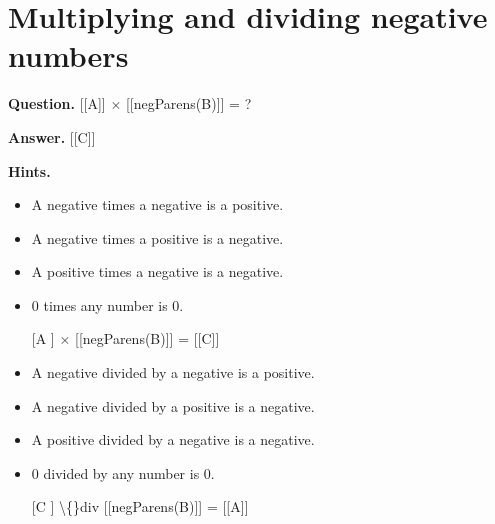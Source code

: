 \documentclass{article}
\begin{document}
\section*{Multiplying and dividing negative numbers}
\textbf{Question.} [[A]] $\times$ [[negParens(B)]] = ?

\textbf{Answer.} [[C]]

\textbf{Hints.}
\begin{itemize}
  \item A negative times a negative is a positive.
  \item A negative times a positive is a negative.
  \item A positive times a negative is a negative.
  \item 0 times any number is 0.
  \item [[A]] $\times$ [[negParens(B)]] = [[C]]
  \item A negative divided by a negative is a positive.
  \item A negative divided by a positive is a negative.
  \item A positive divided by a negative is a negative.
  \item 0 divided by any number is 0.
  \item [[C]] \textbackslash\{\}div [[negParens(B)]] = [[A]]
\end{itemize}
\end{document}
